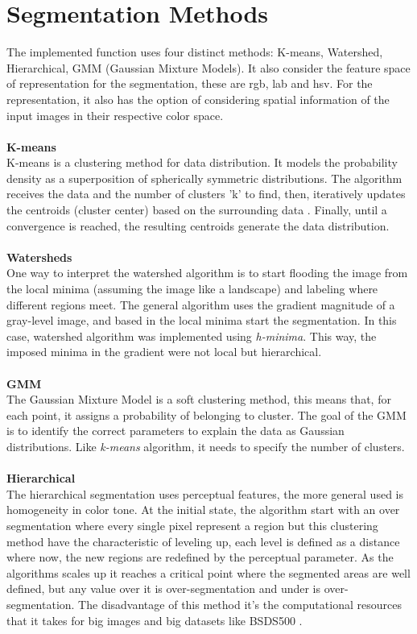 \documentclass[10pt,twocolumn,letterpaper]{article}
\begin{document}
\section{Segmentation Methods}
The implemented function uses four distinct methods: K-means, Watershed, Hierarchical, GMM (Gaussian Mixture Models). It also consider the feature space of representation for the segmentation, these are rgb, lab and hsv. For the representation, it also has the option of considering spatial information of the input images in their respective color space.\\
\\
\textbf{K-means}\\
\indent K-means is a clustering method for data distribution. It models the probability density as a superposition of spherically symmetric distributions. The algorithm receives the data and the number of clusters 'k' to find, then, iteratively updates the centroids (cluster center) based on the surrounding data \cite{szeliski}. Finally, until a convergence is reached, the resulting centroids generate the data distribution.\\
\\
\textbf{Watersheds}\\
\indent One way to interpret the watershed algorithm is to start flooding the image from the local minima (assuming the image like a landscape) and labeling where different regions meet\cite{szeliski}. The general algorithm uses the gradient magnitude of a gray-level image, and based in the local minima start the segmentation. In this case, watershed algorithm was implemented using \textit{h-minima}. This way, the imposed minima in the gradient were not local but hierarchical.\\
\\
\textbf{GMM}\\
\indent The Gaussian Mixture Model is a soft clustering method, this means that, for each point, it assigns a probability of belonging to cluster. The goal of the GMM is to identify the correct parameters to explain the data  as Gaussian distributions. Like \textit{k-means} algorithm, it needs to specify the number of clusters.\\
\\
\textbf{Hierarchical}\\
\indent The hierarchical segmentation uses perceptual features, the more general used is homogeneity in color tone. At the initial state, the algorithm start with an over segmentation where every single pixel represent a region but this clustering method have the characteristic of leveling up, each level is defined as a distance where now, the new regions are redefined by the perceptual parameter. As the algorithms scales up it reaches a critical point where the segmented areas are well defined, but any value over it is over-segmentation and under is over-segmentation. The disadvantage of this method it's the computational resources that it takes for big images and big datasets like BSDS500 \cite{hierarchical}.\\
\end{document}
